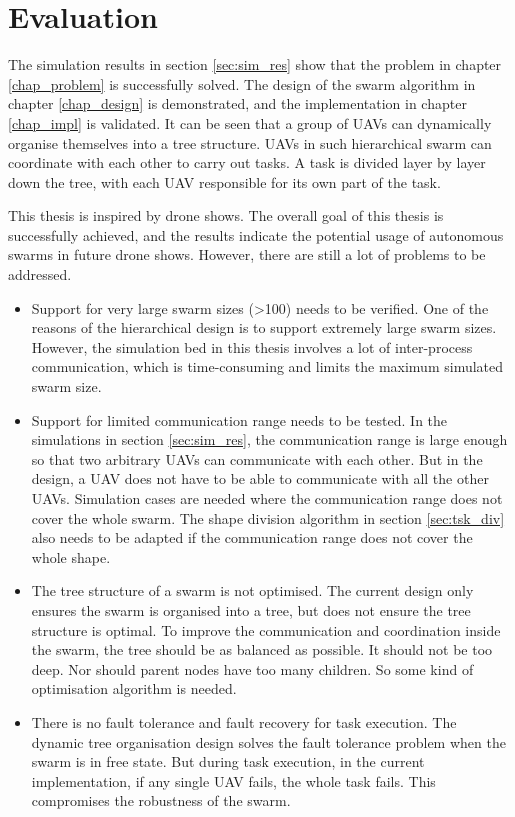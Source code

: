\section{Evaluation}
\label{sec:eval}

The simulation results in section \ref{sec:sim_res} show that
the problem in chapter \ref{chap_problem} is successfully solved.
The design of the swarm algorithm in chapter \ref{chap_design} is demonstrated,
and the implementation in chapter \ref{chap_impl} is validated.
It can be seen that a group of UAVs can dynamically organise themselves into a tree structure.
UAVs in such hierarchical swarm can coordinate with each other to carry out tasks.
A task is divided layer by layer down the tree,
with each UAV responsible for its own part of the task.

This thesis is inspired by drone shows.
The overall goal of this thesis is successfully achieved,
and the results indicate the potential usage of autonomous swarms in future drone shows.
However, there are still a lot of problems to be addressed.
\begin{itemize}
    \item Support for very large swarm sizes (>100) needs to be verified.
          One of the reasons of the hierarchical design is to support extremely large swarm sizes.
          However, the simulation bed in this thesis involves a lot of inter-process communication,
          which is time-consuming and limits the maximum simulated swarm size.
    \item Support for limited communication range needs to be tested.
          In the simulations in section \ref{sec:sim_res},
          the communication range is large enough
          so that two arbitrary UAVs can communicate with each other.
          But in the design, a UAV does not have to be able to communicate with all the other UAVs.
          Simulation cases are needed where the communication range does not cover the whole swarm.
          The shape division algorithm in section \ref{sec:tsk_div} also needs to be adapted
          if the communication range does not cover the whole shape.
    \item The tree structure of a swarm is not optimised.
          The current design only ensures the swarm is organised into a tree,
          but does not ensure the tree structure is optimal.
          To improve the communication and coordination inside the swarm,
          the tree should be as balanced as possible.
          It should not be too deep.
          Nor should parent nodes have too many children.
          So some kind of optimisation algorithm is needed.
    \item There is no fault tolerance and fault recovery for task execution.
          The dynamic tree organisation design solves the fault tolerance problem
          when the swarm is in free state.
          But during task execution, in the current implementation,
          if any single UAV fails, the whole task fails.
          This compromises the robustness of the swarm.
\end{itemize}
